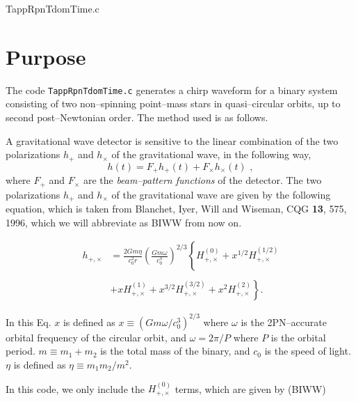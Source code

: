 \documentclass[12pt]{article}
\begin{document}
\huge
\begin{center}
TappRpnTdomTime.c
\end{center}
\normalsize
\vspace{10mm}

\section{Purpose}

The code \texttt{TappRpnTdomTime.c} generates a chirp waveform for a binary system consisting of two non--spinning point--mass stars in quasi--circular orbits, up to second post--Newtonian order. The method used is as follows.

A gravitational wave detector is sensitive to the linear combination of the two polarizations $h_{+}$ and $h_{\times}$ of the gravitational wave, in the following way,
\begin{equation}
h(t) = F_{+} h_{+} (t) + F_{\times} h_{\times} (t) \,\,,
\label{hoft}
\end{equation}
where $F_{+}$ and $F_{\times}$ are the \emph{beam--pattern functions} of the detector.
The two polarizations $h_{+}$ and $h_{\times}$ of the gravitational wave are given by the following equation, which is taken from Blanchet, Iyer, Will and Wiseman, CQG \textbf{13}, 575, 1996, which we will abbreviate as BIWW from now on.

\begin{equation}
\begin{split}
h_{+,\times} &=  \frac{2Gm \eta}{c^{2}_{0} r} \left(\frac{Gm \omega}{c^{3}_{0}} \right)^{2/3} \left\{ \right. H^{(0)}_{+,\times} + x^{1/2} H^{(1/2)}_{+,\times}  \\
             &      \\
             & + x H^{(1)}_{+,\times} + x^{3/2} H^{(3/2)}_{+,\times} + x^{2} H^{(2)}_{+,\times} \left. \right\}.
\label{H+cross}
\end{split}
\end{equation}

In this Eq. $x$ is defined as $x \equiv (Gm \omega/c^{3}_{0})^{2/3}$ where $\omega$ is the 2PN--accurate orbital frequency of the circular orbit, and $\omega=2 \pi/P$ where $P$ is the orbital period. $m \equiv m_{1} + m_{2}$ is the total mass of the binary, and $c_{0}$ is the speed of light. $\eta$ is defined as $\eta \equiv m_{1} m_{2}/m^{2}$.

In this code, we only include the $H^{(0)}_{+,\times}$ terms, which are given by (BIWW)
\end{document}
